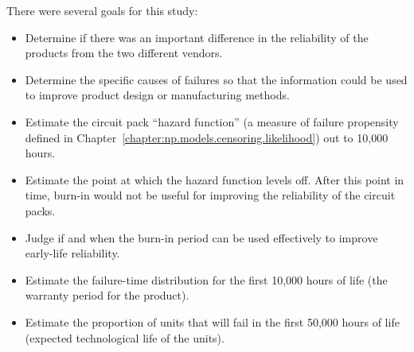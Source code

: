 \begin{example}
There were several goals for this study:
\begin{itemize}
\item
Determine if there was an important difference in the reliability
of the products from the two different vendors.
\item
Determine the specific causes of failures so that the information
could be used to improve product design or manufacturing methods.
\item 
Estimate the circuit pack ``hazard function'' (a measure of failure
propensity defined in
Chapter~\ref{chapter:np.models.censoring.likelihood}) out to 10,000 hours.
\item 
Estimate the point at which the hazard function levels off.
After this point in time, burn-in would not be useful for improving
the reliability of the circuit packs.
\item
Judge if and when the burn-in period can be used effectively to improve
early-life reliability.
\item
Estimate the failure-time distribution for the first 10,000 hours
of life (the warranty period for the product).
\item
Estimate the proportion of units that will fail in the first 50,000 hours
of life (expected technological life of the units).
\end{itemize}
\end{example}

